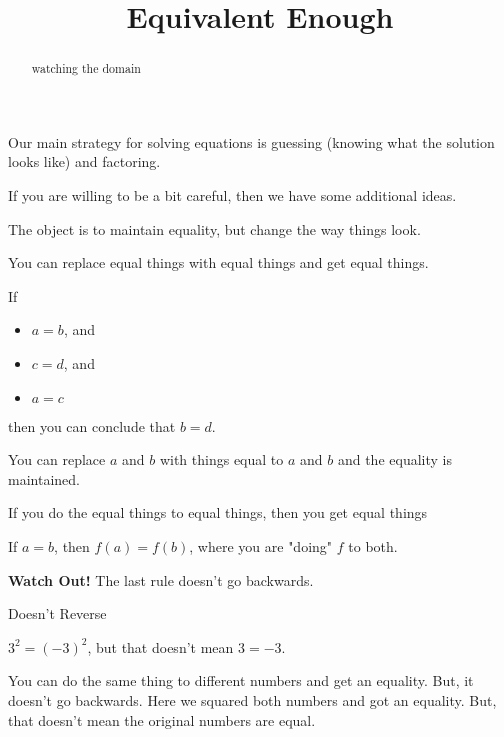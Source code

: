 \documentclass{ximera}
\title{Equivalent Enough}
\begin{document}
\begin{abstract}
watching the domain
\end{abstract}
\maketitle





Our main strategy for solving equations is guessing (knowing what the solution looks like) and factoring.




If you are willing to be a bit careful, then we have some additional ideas.

The object is to maintain equality, but change the way things look.



\begin{observation}


You can replace equal things with equal things and get equal things.


If 
\begin{itemize}
\item $a=b$, and
\item $c=d$, and
\item $a=c$
\end{itemize}
then you can conclude that $b=d$.

You can replace $a$ and $b$ with things equal to $a$ and $b$ and the equality is maintained.


\end{observation}





\begin{observation}


If you do the equal things to equal things, then you get equal things


If $a=b$, then $f(a) = f(b)$, where you are "doing" $f$ to both.



\end{observation}




\textbf{Watch Out!} The last rule doesn't go backwards.




\begin{warning}  Doesn't Reverse



$3^2 = (-3)^2$, but that doesn't mean $3=-3$.


You can do the same thing to different numbers and get an equality.  But, it doesn't go backwards.  Here we squared both numbers and got an equality.  But, that doesn't mean the original numbers are equal.


\end{warning}
\end{document}
